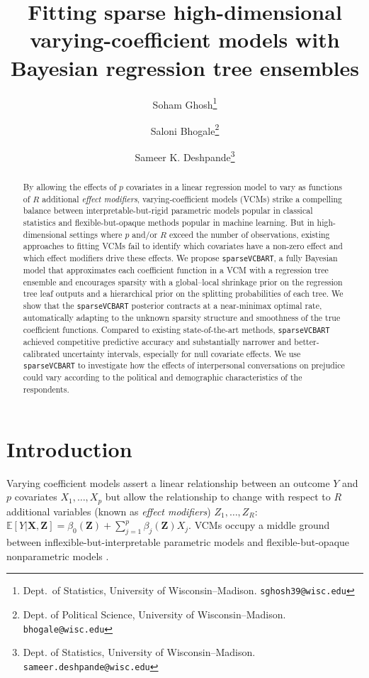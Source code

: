 \documentclass[11pt]{article}
\title{Fitting sparse high-dimensional varying-coefficient models with Bayesian regression tree ensembles}
\author{Soham Ghosh\thanks{Dept.\ of Statistics, University of Wisconsin--Madison. \texttt{sghosh39@wisc.edu}} \and Saloni Bhogale\thanks{Dept. of Political Science, University of Wisconsin--Madison. \texttt{bhogale@wisc.edu}} \and Sameer K. Deshpande\thanks{Dept. of Statistics, University of Wisconsin--Madison. \texttt{sameer.deshpande@wisc.edu}}}
\newcommand{\E}{\mathbb{E}} %
\newcommand{\bX}{\bm{X}}
\newcommand{\bZ}{\bm{Z}}
\theoremstyle{plain}
\theoremstyle{definition}
\theoremstyle{plain}
\begin{document}
\maketitle

\begin{abstract}
By allowing the effects of $p$ covariates in a linear regression model to vary as functions of $R$ additional \emph{effect modifiers}, varying-coefficient models (VCMs) strike a compelling balance between interpretable-but-rigid parametric models popular in classical statistics and flexible-but-opaque methods popular in machine learning.
But in high-dimensional settings where $p$ and/or $R$ exceed the number of observations, existing approaches to fitting VCMs fail to identify which covariates have a non-zero effect and which effect modifiers drive these effects.
We propose \texttt{sparseVCBART}, a fully Bayesian model that approximates each coefficient function in a VCM with a regression tree ensemble and encourages sparsity with a global--local shrinkage prior on the regression tree leaf outputs and a hierarchical prior on the splitting probabilities of each tree.
We show that the \texttt{sparseVCBART} posterior contracts at a near-minimax optimal rate, automatically adapting to the unknown sparsity structure and smoothness of the true coefficient functions.
Compared to existing state-of-the-art methods, \texttt{sparseVCBART} achieved competitive predictive accuracy and substantially narrower and better-calibrated uncertainty intervals, especially for null covariate effects.
We use \texttt{sparseVCBART} to investigate how the effects of interpersonal conversations on prejudice could vary according to the political and demographic characteristics of the respondents.

\end{abstract}

\section{Introduction}
\label{sec:intro}
Varying coefficient models \citep[VCMs;][]{Hastie1993} assert a linear relationship between an outcome $Y$ and $p$ covariates $X_{1}, \ldots, X_{p}$ but allow the relationship to change with respect to $R$ additional variables (known as \emph{effect modifiers}) $Z_{1}, \ldots, Z_{R}$: $\E[Y \vert \bX, \bZ] = \beta_{0}(\bZ) + \sum_{j = 1}^{p}{\beta_{j}(\bZ)X_{j}}.$
VCMs occupy a middle ground between inflexible-but-interpretable parametric models and flexible-but-opaque nonparametric models \citep{ZhouHooker2022,Lengerich2023}.
\end{document}

